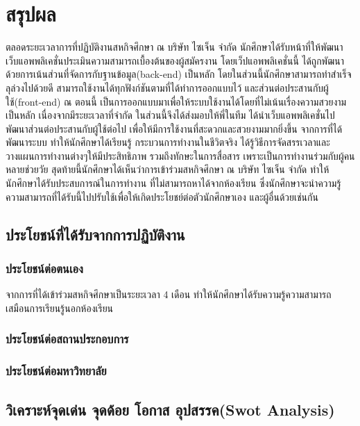 \chapter{สรุปผล}
\label{chapter:conclusion}

ตลอดระยะเวลาการที่ปฏิบัติงานสหกิจศึกษา ณ บริษัท ไซเจ็น จำกัด นักศึกษาได้รับหน้าที่ให้พัฒนา เว็บแอพพลิเคชั่นประเมินความสามารถเบื้องต้นของผู้สมัครงาน โดยเว็ปแอพพลิเคชั่นนี้ ได้ถูกพัฒนาด้วยการเน้นส่วนที่จัดการกับฐานข้อมูล(back-end) เป็นหลัก โดยในส่วนนี้นักศึกษาสามารถทำสำเร็จลุล่วงไปด้วยดี สามารถใช้งานได้ทุกฟังก์ชันตามที่ได้ทำการออกแบบไว้ และส่วนต่อประสานกับผู้ใช้(front-end) ณ ตอนนี้ เป็นการออกแบบมาเพื่อให้ระบบใช้งานได้โดยที่ไม่เน้นเรื่องความสวยงามเป็นหลัก เนื่องจากมีระยะเวลาที่จำกัด ในส่วนนี้จึงได้ส่งมอบให้พี่ในทีม ได้นำเว็บแอพพลิเคชั่นไปพัฒนาส่วนต่อประสานกับผู้ใช้ต่อไป เพื่อให้มีการใช้งานที่สะดวกและสวยงามมากยิ่งขึ้น จากการที่ได้พัฒนาระบบ ทำให้นักศึกษาได้เรียนรู้ กระบวนการทำงานในชีวิตจริง ได้รู้วิธีการจัดสรรเวลาและวางแผนการทำงานต่างๆให้มีประสิทธิภาพ รวมถึงทักษะในการสื่อสาร เพราะเป็นการทำงานร่วมกับผู้คนหลายช่วยวัย สุดท้ายนี้นักศึกษาได้เห็นว่าการเข้าร่วมสหกิจศึกษา ณ บริษัท ไซเจ็น จำกัด ทำให้นักศึกษาได้รับประสบการณ์ในการทำงาน ที่ไม่สามารถหาได้จากห้องเรียน ซึ่งนักศึกษาจะนำความรู้ความสามารถที่ได้รับนี้ไปปรับใช้เพื่อให้เกิดประโยชย์ต่อตัวนักศึกษาเอง และผู้อื่นด้วยเช่นกัน

\section{ประโยชน์ที่ได้รับจากการปฏิบัติงาน}

\subsection{ประโยชน์ต่อตนเอง}

จากการที่ได้เข้าร่วมสหกิจศึกษาเป็นระยะเวลา 4 เดือน ทำให้นักศึกษาได้รับความรู้ความสามารถ เสมือนการเรียนรู้นอกห้องเรียน

\subsection{ประโยชน์ต่อสถานประกอบการ}

\subsection{ประโยชน์ต่อมหาวิทยาลัย}

\section{วิเคราะห์จุดเด่น จุดด้อย โอกาส อุปสรรค(Swot Analysis)}

